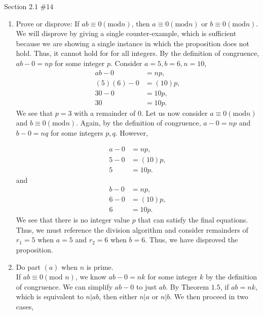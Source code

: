 \documentclass[12pt]{article}
\newenvironment{problem}[2][Problem]{\begin{trivlist}
\item[\hskip \labelsep {\bfseries #1}\hskip \labelsep {\bfseries #2.}]}{\end{trivlist}}
\begin{document}
\begin{problem}{5} Section $2.1$ $\#14$ \\

\noindent
\begin{enumerate}[label=(\alph*)]
\item Prove or disprove: If $ab \equiv 0 (\text{mod}n)$, then $a \equiv 0 (\text{mod}n)$ or $b \equiv 0 (\text{mod}n)$. \\

\noindent
We will disprove by giving a single counter-example, which is sufficient because we are showing a single instance in which the proposition does not hold. Thus, it cannot hold for for all integers. By the definition of congruence, $ab-0=np$ for some integer $p$. Consider $a=5,b=6,n=10$,
\begin{align*}
ab-0 & =np, \\
(5)(6)-0 & =(10)p, \\
30-0 & =10p, \\
30 & =10p.
\end{align*}
\noindent
We see that $p=3$ with a remainder of $0$. Let us now consider $a \equiv 0 (\text{mod}n)$ and $b \equiv 0 (\text{mod}n)$. Again, by the definition of congruence, $a-0=np$ and $b-0=nq$ for some integers $p,q$. However,

\begin{align*}
a-0 & =np, \\
5-0 & =(10)p, \\
5 & =10p.
\end{align*}
\noindent
and
\begin{align*}
b-0 & =np, \\
6-0 & =(10)p, \\
6 & =10p.
\end{align*}
\noindent
We see that there is no integer value $p$ that can satisfy the final equations. Thus, we must reference the division algorithm and consider remainders of $r_1=5$ when $a=5$ and $r_2=6$ when $b=6$. Thus, we have disproved the proposition. \\

\item Do part $(a)$ when $n$ is prime. \\

If $ab \equiv 0 (\text{mod }n)$, we know $ab-0=nk$ for some integer $k$ by the definition of congruence. We can simplify $ab-0$ to just $ab$. By Theorem $1.5$, if $ab=nk$, which is equivalent to $n|ab$, then either $n|a$ or $n|b$. We then proceed in two cases, \\


\end{enumerate}
\end{problem}
\end{document}
